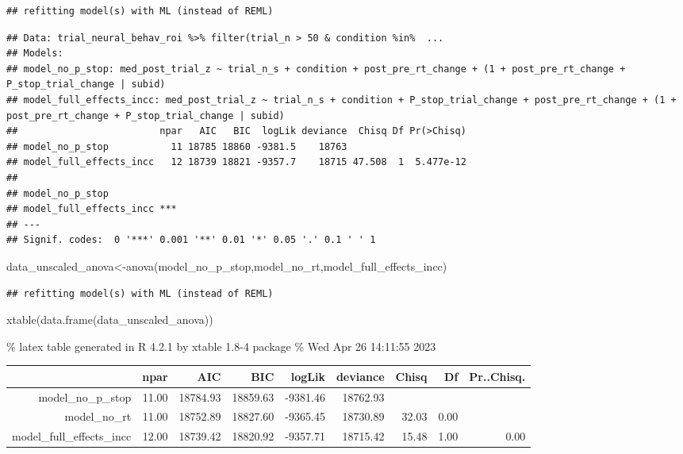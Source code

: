 \documentclass[
]{article}
\newenvironment{Shaded}{\begin{snugshade}}{\end{snugshade}}
\newcommand{\FunctionTok}[1]{\textcolor[rgb]{0.00,0.00,0.00}{#1}}
\newcommand{\NormalTok}[1]{#1}
\newcommand{\OtherTok}[1]{\textcolor[rgb]{0.56,0.35,0.01}{#1}}
\begin{document}
\begin{verbatim}
## refitting model(s) with ML (instead of REML)
\end{verbatim}

\begin{verbatim}
## Data: trial_neural_behav_roi %>% filter(trial_n > 50 & condition %in%  ...
## Models:
## model_no_p_stop: med_post_trial_z ~ trial_n_s + condition + post_pre_rt_change + (1 + post_pre_rt_change + P_stop_trial_change | subid)
## model_full_effects_incc: med_post_trial_z ~ trial_n_s + condition + P_stop_trial_change + post_pre_rt_change + (1 + post_pre_rt_change + P_stop_trial_change | subid)
##                         npar   AIC   BIC  logLik deviance  Chisq Df Pr(>Chisq)
## model_no_p_stop           11 18785 18860 -9381.5    18763                     
## model_full_effects_incc   12 18739 18821 -9357.7    18715 47.508  1  5.477e-12
##                            
## model_no_p_stop            
## model_full_effects_incc ***
## ---
## Signif. codes:  0 '***' 0.001 '**' 0.01 '*' 0.05 '.' 0.1 ' ' 1
\end{verbatim}

\begin{Shaded}
\begin{Highlighting}[]
\NormalTok{data\_unscaled\_anova}\OtherTok{\textless{}{-}}\FunctionTok{anova}\NormalTok{(model\_no\_p\_stop,model\_no\_rt,model\_full\_effects\_incc)}
\end{Highlighting}
\end{Shaded}

\begin{verbatim}
## refitting model(s) with ML (instead of REML)
\end{verbatim}

\begin{Shaded}
\begin{Highlighting}[]
\FunctionTok{xtable}\NormalTok{(}\FunctionTok{data.frame}\NormalTok{(data\_unscaled\_anova))}
\end{Highlighting}
\end{Shaded}

\% latex table generated in R 4.2.1 by xtable 1.8-4 package \% Wed Apr
26 14:11:55 2023

\begin{table}[ht]
\centering
\begin{tabular}{rrrrrrrrr}
  \hline
 & npar & AIC & BIC & logLik & deviance & Chisq & Df & Pr..Chisq. \\ 
  \hline
model\_no\_p\_stop & 11.00 & 18784.93 & 18859.63 & -9381.46 & 18762.93 &  &  &  \\ 
  model\_no\_rt & 11.00 & 18752.89 & 18827.60 & -9365.45 & 18730.89 & 32.03 & 0.00 &  \\ 
  model\_full\_effects\_incc & 12.00 & 18739.42 & 18820.92 & -9357.71 & 18715.42 & 15.48 & 1.00 & 0.00 \\ 
   \hline
\end{tabular}
\end{table}
\end{document}
